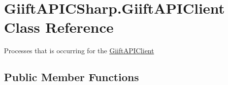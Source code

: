 \hypertarget{class_giift_a_p_i_c_sharp_1_1_giift_a_p_i_client}{}\section{Giift\+A\+P\+I\+C\+Sharp.\+Giift\+A\+P\+I\+Client Class Reference}
\label{class_giift_a_p_i_c_sharp_1_1_giift_a_p_i_client}


Processes that is occurring for the \hyperlink{class_giift_a_p_i_c_sharp_1_1_giift_a_p_i_client}{Giift\+A\+P\+I\+Client}  


\subsection*{Public Member Functions}
